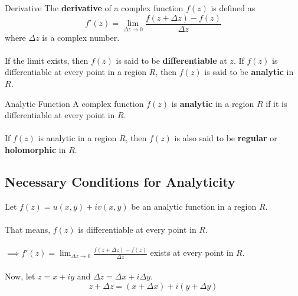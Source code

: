 \begin{definition}{Derivative}{}
    The \textbf{derivative} of a complex function $f(z)$ is defined as
    \[
        f'(z) = \lim_{\Delta z \to 0} \frac{f(z + \Delta z) - f(z)}{\Delta z}
    \]
    where $\Delta z$ is a complex number. \\~\\
    
    If the limit exists, then $f(z)$ is said to be \textbf{differentiable} at $z$. If $f(z)$ is differentiable at every point in a region $R$, then $f(z)$ is said to be \textbf{analytic} in $R$.
\end{definition}

\begin{definition}{Analytic Function}{}
    A complex function $f(z)$ is \textbf{analytic} in a region $R$ if it is differentiable at every point in $R$. \\~\\
    
    If $f(z)$ is analytic in a region $R$, then $f(z)$ is also said to be \textbf{regular} or \textbf{holomorphic} in $R$.
\end{definition}


\subsection{Necessary Conditions for Analyticity}
Let $f(z) = u(x,y) + iv(x,y)$ be an analytic function in a region $R$. \\~\\

That means, $f(z)$ is differentiable at every point in $R$. \\~\\

$\displaystyle\implies f'(z) = \lim_{\Delta z \to 0} \frac{f(z + \Delta z) - f(z)}{\Delta z}$ exists at every point in $R$. \\~\\

Now, let $z = x+iy$ and $\Delta z = \Delta x + i\Delta y$.
\[ z + \Delta z = (x + \Delta x) + i(y + \Delta y) \]

